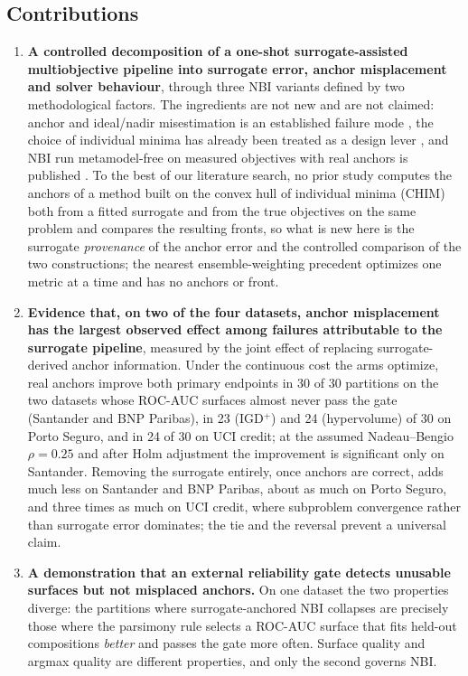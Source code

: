 \subsection{Contributions}

\begin{enumerate}
\item \textbf{A controlled decomposition of a one-shot surrogate-assisted multiobjective pipeline into surrogate
error, anchor misplacement and solver behaviour}, through three NBI variants defined by two methodological factors.
The ingredients are not new and are not claimed: anchor and ideal/nadir misestimation is an established failure mode
\citep{isermann1988payoff,deb2010nadir,he2021normalization}, the choice of individual minima has already been treated
as a design lever \citep{herrmann2026nonextreme}, and NBI run metamodel-free on measured objectives with real anchors
is published \citep{gellerich2023doenbi}. To the best of our literature search, no prior study computes the anchors
of a method built on the convex hull of individual minima (CHIM) both from a fitted surrogate and from the true
objectives on the same problem and compares the resulting fronts, so
what is new here is the surrogate \emph{provenance} of the anchor error and the controlled comparison of the two
constructions; the nearest ensemble-weighting precedent \citep{kwon2024ensemble} optimizes one metric at a time and
has no anchors or front.

\item \textbf{Evidence that, on two of the four datasets, anchor misplacement has the largest observed effect among
failures attributable to the surrogate pipeline}, measured by the joint effect of replacing surrogate-derived anchor
information. Under the continuous cost the arms optimize, real anchors improve both
primary endpoints in 30 of 30 partitions on the two datasets whose ROC-AUC surfaces almost never pass the gate
(Santander and BNP Paribas), in 23 (IGD$^+$) and 24 (hypervolume) of 30 on Porto Seguro, and in 24 of 30 on UCI
credit; at the assumed Nadeau--Bengio $\rho = 0.25$ and after Holm adjustment the improvement is significant only
on Santander. Removing the surrogate entirely, once
anchors are correct, adds much less on Santander and BNP Paribas, about as much on Porto Seguro, and three times as
much on UCI credit, where subproblem convergence rather than surrogate error dominates; the tie and the reversal
prevent a universal claim.

\item \textbf{A demonstration that an external reliability gate detects unusable surfaces but not misplaced anchors.}
On one dataset the two properties diverge: the partitions where surrogate-anchored NBI collapses are precisely those
where the parsimony rule selects a ROC-AUC surface that fits held-out compositions \emph{better} and passes the gate more
often. Surface quality and argmax quality are different properties, and only the second governs NBI.


\end{enumerate}
